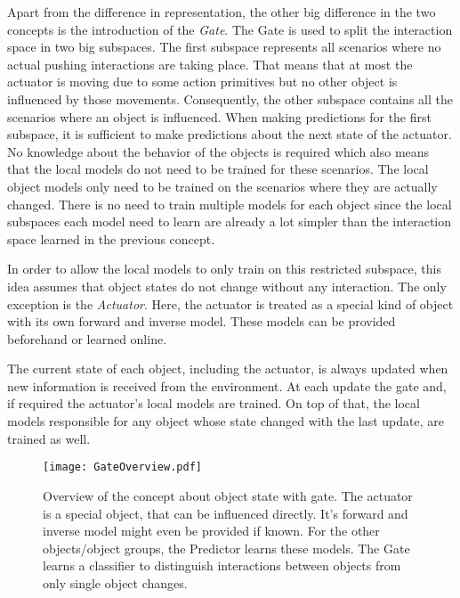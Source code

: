 Apart from the difference in representation, the other big difference in the two concepts is the introduction of the \textit{Gate}. The Gate is used to split the interaction space in two big subspaces. The first subspace represents all scenarios where no actual pushing interactions are taking place. That means that at most the actuator is moving due to some action primitives but no other object is influenced by those movements. Consequently, the other subspace contains all the scenarios where an object is influenced. When making predictions for the first subspace, it is sufficient to make predictions about the next state of the actuator. No knowledge about the behavior of the objects is required which also means that the local models do not need to be trained for these scenarios. The local object models only need to be trained on the scenarios where they are actually changed. 
There is no need to train multiple models for each object since the local subspaces each model need to learn are already a lot simpler than the interaction space learned in the previous concept.

In order to allow the local models to only train on this restricted subspace, this idea assumes that object states do not change without any interaction. The only exception is the \textit{Actuator}. Here, the actuator is treated as a special kind of object with its own forward and inverse model. These models can be provided beforehand or learned online. 

The current state of each object, including the actuator, is always updated when new information is received from the environment. At each update the gate and, if required the actuator's local models are trained. On top of that, the local models responsible for any object whose state changed with the last update, are trained as well.


\begin{figure}
	\centering
	\texttt{[image: GateOverview.pdf]}
	\caption{Overview of the concept about object state with gate. The actuator is a special object, that can be influenced directly. It's forward and inverse model might even be provided if known. For the other objects/object groups, the Predictor learns these models. The Gate learns a classifier to distinguish interactions between objects from only single object changes.} 
	\label{fig:GateOverview}
\end{figure}

